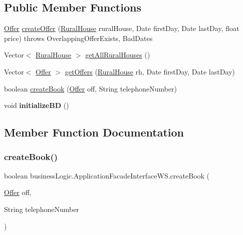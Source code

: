 \subsection*{Public Member Functions}
\begin{DoxyCompactItemize}
\item 
\mbox{\hyperlink{classdomain_1_1_offer}{Offer}} \mbox{\hyperlink{interfacebusiness_logic_1_1_application_facade_interface_w_s_a0e8d2135ef1384a32e74f60bcea55f09}{create\+Offer}} (\mbox{\hyperlink{classdomain_1_1_rural_house}{Rural\+House}} rural\+House, Date first\+Day, Date last\+Day, float price)  throws Overlapping\+Offer\+Exists, Bad\+Dates
\item 
Vector$<$ \mbox{\hyperlink{classdomain_1_1_rural_house}{Rural\+House}} $>$ \mbox{\hyperlink{interfacebusiness_logic_1_1_application_facade_interface_w_s_a553cbfb37ea9f1621ba76ad8308a15da}{get\+All\+Rural\+Houses}} ()
\item 
Vector$<$ \mbox{\hyperlink{classdomain_1_1_offer}{Offer}} $>$ \mbox{\hyperlink{interfacebusiness_logic_1_1_application_facade_interface_w_s_ae338a96d039003c64fceb68d667736f1}{get\+Offers}} (\mbox{\hyperlink{classdomain_1_1_rural_house}{Rural\+House}} rh, Date first\+Day, Date last\+Day)
\item 
boolean \mbox{\hyperlink{interfacebusiness_logic_1_1_application_facade_interface_w_s_a1fd4f6fccc600ed8127e06fa34a10512}{create\+Book}} (\mbox{\hyperlink{classdomain_1_1_offer}{Offer}} off, String telephone\+Number)
\item 
\mbox{\label{interfacebusiness_logic_1_1_application_facade_interface_w_s_a59eacfa5890466c6a338d0df2e487965}} 
void {\bfseries initialize\+BD} ()
\end{DoxyCompactItemize}


\subsection{Member Function Documentation}
\mbox{\label{interfacebusiness_logic_1_1_application_facade_interface_w_s_a1fd4f6fccc600ed8127e06fa34a10512}} 
\subsubsection{\texorpdfstring{createBook()}{createBook()}}
{\footnotesize\ttfamily boolean business\+Logic.\+Application\+Facade\+Interface\+W\+S.\+create\+Book (\begin{DoxyParamCaption}\item[{\mbox{\hyperlink{classdomain_1_1_offer}{Offer}}}]{off,  }\item[{String}]{telephone\+Number }\end{DoxyParamCaption})}

